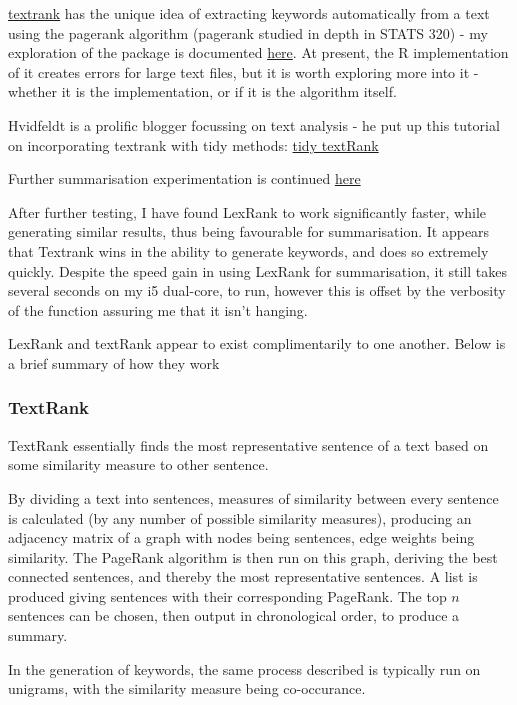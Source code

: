\documentclass[11pt]{article}
\begin{document}
\href{https://github.com/bnosac/textrank}{textrank} has the unique idea of extracting keywords automatically from
a text using the pagerank algorithm (pagerank studied in depth in
STATS 320) - my exploration of the package is documented \href{./textrank\_exploration.Rmd}{here}. At
present, the R implementation of it creates errors for large text
files, but it is worth exploring more into it - whether it is the
implementation, or if it is the algorithm itself.

Hvidfeldt is a prolific blogger focussing on text analysis - he put up
this tutorial on incorporating textrank with tidy methods: \href{https://www.hvitfeldt.me/blog/tidy-text-summarization-using-textrank/}{tidy
textRank}

Further summarisation experimentation is continued \href{summarisation\_experimentation.Rmd}{here}

After further testing, I have found LexRank to work significantly
faster, while generating similar results, thus being favourable for
summarisation. It appears that Textrank wins in the ability to
generate keywords, and does so extremely quickly. Despite the speed
gain in using LexRank for summarisation, it still takes several
seconds on my i5 dual-core, to run, however this is offset by the
verbosity of the function assuring me that it isn't hanging.

LexRank and textRank appear to exist complimentarily to one another.
Below is a brief summary of how they work

\subsubsection{TextRank}
\label{sec:org3fd094d}

TextRank essentially finds the most representative sentence of a text
based on some similarity measure to other sentence.

By dividing a text into sentences, measures of similarity between every
sentence is calculated (by any number of possible similarity measures),
producing an adjacency matrix of a graph with nodes being sentences,
edge weights being similarity. The PageRank algorithm is then run on
this graph, deriving the best connected sentences, and thereby the most
representative sentences. A list is produced giving sentences with their
corresponding PageRank. The top \(n\) sentences can be chosen, then output
in chronological order, to produce a summary.

In the generation of keywords, the same process described is typically
run on unigrams, with the similarity measure being co-occurance.
\end{document}
